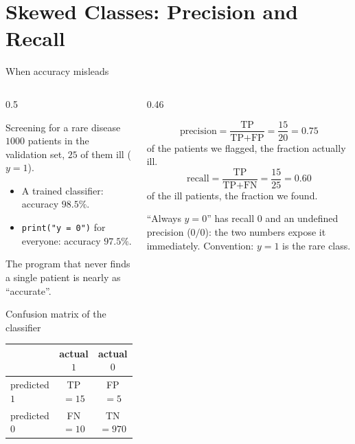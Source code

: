 \documentclass[aspectratio=169,10pt]{beamer}
\begin{document}
\section{Skewed Classes: Precision and Recall}

\begin{frame}{When accuracy misleads}
  \begin{columns}[T,onlytextwidth]
    \begin{column}{0.5\textwidth}
      \footnotesize
      \begin{block}{Screening for a rare disease}
        $1000$ patients in the validation set, $25$ of them ill ($y=1$).
        \begin{itemize}
          \item A trained classifier: accuracy $98.5\%$.
          \item \texttt{print("y = 0")} for everyone: accuracy $97.5\%$.
        \end{itemize}
        The program that never finds a single patient is nearly as ``accurate''.
      \end{block}
      \begin{block}{Confusion matrix of the classifier}
        \centering
        \renewcommand{\arraystretch}{1.25}
        \begin{tabular}{@{}l|cc@{}}
          & actual $1$ & actual $0$\\
          \hline
          predicted $1$ & TP $=15$ & FP $=5$\\
          predicted $0$ & FN $=10$ & TN $=970$\\
        \end{tabular}
      \end{block}
    \end{column}
    \begin{column}{0.46\textwidth}
      \footnotesize
      \begin{defnbox}
        \small
        \[ \text{precision}=\frac{\text{TP}}{\text{TP}+\text{FP}}=\frac{15}{20}=0.75 \]
        of the patients we flagged, the fraction actually ill.
        \[ \text{recall}=\frac{\text{TP}}{\text{TP}+\text{FN}}=\frac{15}{25}=0.60 \]
        of the ill patients, the fraction we found.
      \end{defnbox}
      \begin{keyidea}
        ``Always $y=0$'' has recall $0$ and an undefined precision ($0/0$): the two numbers
        expose it immediately. Convention: $y=1$ is the rare class.
      \end{keyidea}
    \end{column}
  \end{columns}
\end{frame}
\end{document}
